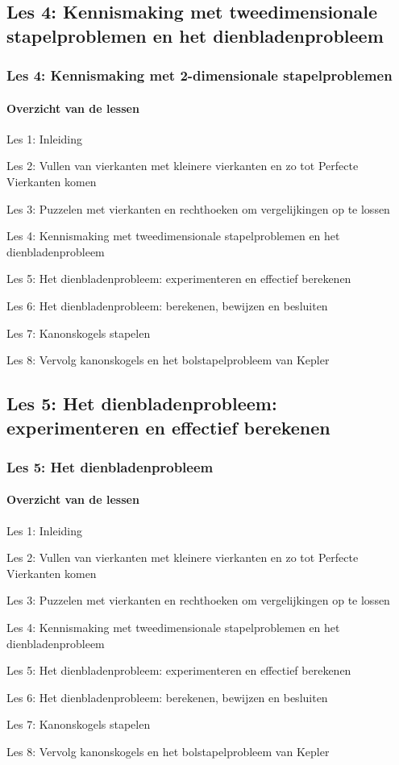 \documentclass[dutch]{beamer}
\begin{document}
\subsection{Les 4: Kennismaking met tweedimensionale stapelproblemen en het dienbladenprobleem}
\begin{frame}
\frametitle{Les 4: Kennismaking met 2-dimensionale stapelproblemen}
\framesubtitle{Overzicht van de lessen}
\begin{list}{\quad}{}
\item Les 1: Inleiding
\item Les 2: Vullen van vierkanten met kleinere vierkanten en zo tot Perfecte Vierkanten komen
\item Les 3: Puzzelen met vierkanten en rechthoeken om vergelijkingen op te lossen
\item {\color{blue}Les 4: Kennismaking met tweedimensionale stapelproblemen en het dienbladenprobleem}
\item Les 5: Het dienbladenprobleem: experimenteren en effectief berekenen
\item Les 6: Het dienbladenprobleem: berekenen, bewijzen en besluiten
\item Les 7: Kanonskogels stapelen
\item Les 8: Vervolg kanonskogels en het bolstapelprobleem van Kepler
\end{list}
\end{frame}

\subsection{Les 5: Het dienbladenprobleem: experimenteren en effectief berekenen}
\begin{frame}
\frametitle{Les 5: Het dienbladenprobleem}
\framesubtitle{Overzicht van de lessen}
\begin{list}{\quad}{}
\item Les 1: Inleiding
\item Les 2: Vullen van vierkanten met kleinere vierkanten en zo tot Perfecte Vierkanten komen
\item Les 3: Puzzelen met vierkanten en rechthoeken om vergelijkingen op te lossen
\item Les 4: Kennismaking met tweedimensionale stapelproblemen en het dienbladenprobleem 
\item {\color{blue}Les 5: Het dienbladenprobleem: experimenteren en effectief berekenen}
\item Les 6: Het dienbladenprobleem: berekenen, bewijzen en besluiten
\item Les 7: Kanonskogels stapelen
\item Les 8: Vervolg kanonskogels en het bolstapelprobleem van Kepler
\end{list}
\end{frame}
\end{document}
